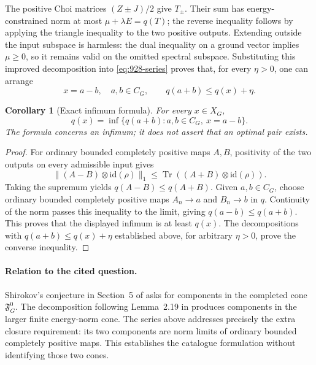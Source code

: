 \documentclass[11pt,a4paper]{article}
\newtheorem{corollary}[theorem]{Corollary}
\theoremstyle{remark}
\begin{document}
The positive Choi matrices $(Z\pm J)/2$ give $T_\pm$. Their sum has
energy-constrained norm at most $\mu+\lambda E=q(T)$; the reverse inequality
follows by applying the triangle inequality to the two positive outputs.
Extending outside the input subspace is harmless: the dual inequality on a
ground vector implies $\mu\ge0$, so it remains valid on the omitted spectral
subspace. Substituting this improved decomposition into
\eqref{eq:928-series} proves that, for every $\eta>0$, one can arrange
\[
 x=a-b,\quad a,b\in C_G,\qquad q(a+b)\le q(x)+\eta.
\]

\begin{corollary}[Exact infimum formula]\label{cor:928-infnorm}
For every $x\in X_G$,
\[
 q(x)=\inf\{q(a+b):a,b\in C_G,\ x=a-b\}.
\]
The formula concerns an infimum; it does not assert that an optimal pair exists.
\end{corollary}
\begin{proof}
For ordinary bounded completely positive maps $A,B$, positivity of the two
outputs on every admissible input gives
\[
 \|(A-B)\otimes\mathrm{id}(\rho)\|_1
 \le\operatorname{Tr}((A+B)\otimes\mathrm{id}(\rho)).
\]
Taking the supremum yields $q(A-B)\le q(A+B)$. Given $a,b\in C_G$, choose
ordinary bounded completely positive maps $A_n\to a$ and $B_n\to b$ in
$q$. Continuity of the norm passes this inequality to the limit, giving
$q(a-b)\le q(a+b)$. This proves that the displayed infimum is at least
$q(x)$. The decompositions with $q(a+b)\le q(x)+\eta$ established above,
for arbitrary $\eta>0$, prove the converse inequality.
\end{proof}

\paragraph{Relation to the cited question.}
Shirokov's conjecture in Section~5 of \cite{Shirokov2019} asks for components
in the completed cone $\mathfrak F_G^0$. The decomposition following
Lemma~2.19 in \cite{vanLuijk2025} produces components in the larger finite
energy-norm cone. The series above addresses precisely the extra closure
requirement: its two components are norm limits of ordinary bounded
completely positive maps. This establishes the catalogue formulation
\cite{AIM} without identifying those two cones.
\end{document}
